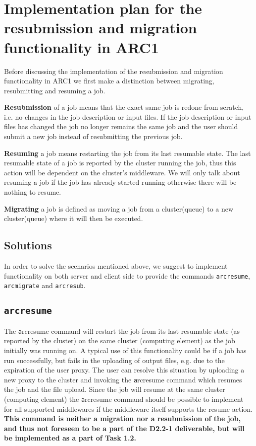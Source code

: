 \documentclass[11pt,oneside,a4paper,english]{article}
\newcommand{\arcmigrate}{\texttt{arcmigrate}\xspace}
\begin{document}
\section*{Implementation plan for the resubmission and migration functionality in ARC1}
Before discussing the implementation of the resubmission and migration functionality in ARC1 we first make a distinction between migrating, resubmitting and resuming a job.

{\bf Resubmission} of a job means that the exact same job is redone from scratch, i.e. no changes in the job description or input files. If the job description or input files has changed the job no longer remains the same job and the user should submit a new job instead of resubmitting the previous job.

{\bf Resuming} a job means restarting the job from its last resumable state. The last resumable state of a job is reported by the cluster running the job, thus this action will be dependent on the cluster's middleware. We will only talk about resuming a job if the job has already started running otherwise there will be nothing to resume.

{\bf Migrating} a job is defined as moving a job from a cluster(queue) to a new cluster(queue) where it will then be executed. 

\subsection*{Solutions}
In order to solve the scenarios mentioned above, we suggest to implement functionality on both server and client side to provide the commands \texttt{arcresume}, \arcmigrate and \texttt{arcresub}.

\subsection*{\texttt{arcresume}}
The {\texttt arcresume} command will restart the job from its last resumable state (as reported by the cluster) on the same cluster (computing element) as the job initially was running on. A typical use of this functionality could be if a job has run successfully, but fails in the uploading of output files, e.g. due to the expiration of the user proxy. The user can resolve this situation by uploading a new proxy to the cluster and invoking the {\texttt arcresume} command which resumes the job and the file upload. Since the job will resume at the same cluster (computing element) the {\texttt arcresume} command should be possible to implement for all supported middlewares if the middleware itself supports the resume action. {\bf This command is neither a migration nor a resubmission of the job, and thus not foreseen to be a part of the D2.2-1 deliverable, but will be implemented as a part of Task 1.2.}
\end{document}
